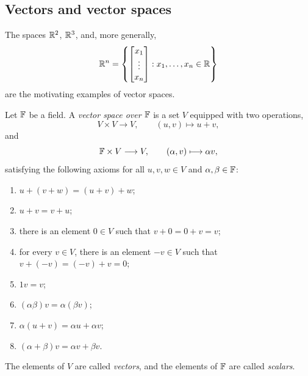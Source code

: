 \subsection{Vectors and vector spaces}

The spaces $\mathbb{R}^2$, $\mathbb{R}^3$, and, more generally,
\[
  \mathbb{R}^n
  =\left\{
    \begin{bmatrix}
      x_1\\ \vdots\\ x_n
    \end{bmatrix}
    :x_1,\ldots,x_n\in\mathbb{R}
  \right\}
\]
are the motivating examples of vector spaces.

\begin{definition}
  Let $\mathbb{F}$ be a field. A \emph{vector space over $\mathbb{F}$} is a set
  $V$ equipped with two operations,
  \[
    V\times V\longrightarrow V,
    \qquad
    (u,v)\longmapsto u+v,
  \]
  and
  \[
    \mathbb{F}\times V\longrightarrow V,
    \qquad
    (\alpha,v)\longmapsto\alpha v,
  \]
  satisfying the following axioms for all $u,v,w\in V$ and
  $\alpha,\beta\in\mathbb{F}$:
  \begin{enumerate}[label=(V\arabic*)]
    \item $u+(v+w)=(u+v)+w$;
    \item $u+v=v+u$;
    \item there is an element $0\in V$ such that $v+0=0+v=v$;
    \item for every $v\in V$, there is an element $-v\in V$ such that
      $v+(-v)=(-v)+v=0$;
    \item $1v=v$;
    \item $(\alpha\beta)v=\alpha(\beta v)$;
    \item $\alpha(u+v)=\alpha u+\alpha v$;
    \item $(\alpha+\beta)v=\alpha v+\beta v$.
  \end{enumerate}
\end{definition}

The elements of $V$ are called \emph{vectors}, and the elements of
$\mathbb{F}$ are called \emph{scalars}.
